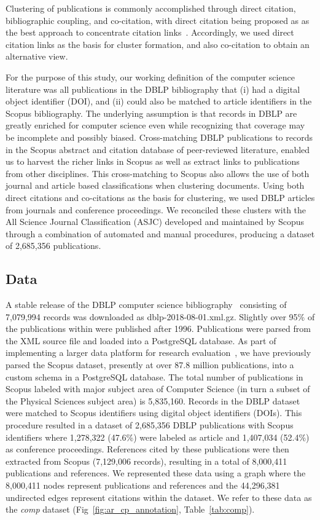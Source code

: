 Clustering of publications is commonly accomplished through direct citation, bibliographic coupling, and co-citation, with direct citation being proposed as as the best approach to concentrate citation links~\cite{klavans_which_2017}. Accordingly, we used direct citation links as the basis for cluster formation, and also co-citation to obtain an alternative view.

For the purpose of this study, our working definition of the computer science literature was all publications in the DBLP bibliography that (i) had a digital object identifier (DOI), and (ii) could also be matched to article identifiers in the Scopus bibliography. The underlying assumption is that records in DBLP are greatly enriched for computer science even while recognizing that coverage may be incomplete and possibly biased. Cross-matching DBLP publications to records in the Scopus abstract and citation database of peer-reviewed literature, enabled us to harvest the richer links in Scopus as well as extract links to publications from other disciplines. This cross-matching to Scopus also allows the use of both journal and article based classifications when clustering documents. Using both direct citations and co-citations as the basis for clustering, we used DBLP articles from journals and conference proceedings. We reconciled these clusters with the All Science Journal Classification (ASJC) developed and maintained by Scopus through a combination of automated and manual procedures, producing a dataset of  2,685,356 publications.

\subsection{Data}
A stable release of the DBLP computer science bibliography~\cite{dblp_ref} consisting of 7,079,994 records was downloaded as dblp-2018-08-01.xml.gz. Slightly over 95\% of the publications within were published after 1996. Publications were parsed from the XML source file and loaded into a PostgreSQL database. As part of implementing a larger data platform for research evaluation~\cite{GithubERNIE2019}, we have previously parsed the Scopus dataset, presently at over 87.8 million publications, into a custom schema in a PostgreSQL database. The total number of publications in Scopus labeled with major subject area of Computer Science (in turn a subset of the Physical Sciences subject area) is 5,835,160. Records in the DBLP dataset were matched to Scopus identifiers using digital object identifiers (DOIs). This procedure resulted in a dataset of 2,685,356 DBLP publications with Scopus identifiers where 1,278,322 (47.6\%) were labeled as article and 1,407,034 (52.4\%) as conference proceedings.  References cited by these publications were then extracted from Scopus (7,129,006 records), resulting in a total of 8,000,411 
publications and references. 
We represented these data using a graph where the 8,000,411 nodes represent
publications and references  and the 44,296,381 undirected edges represent citations within the dataset. 
We refer to these data as the  \emph{comp} dataset (Fig~\ref{fig:ar_cp_annotation}, Table~\ref{tab:comp}).  
 
